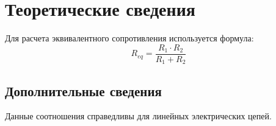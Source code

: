 \section{Теоретические сведения}
Для расчета эквивалентного сопротивления используется формула:
\begin{equation}
    R_{eq} = \frac{R_1 \cdot R_2}{R_1 + R_2}
\end{equation}

\subsection{Дополнительные сведения}
Данные соотношения справедливы для линейных электрических цепей.
